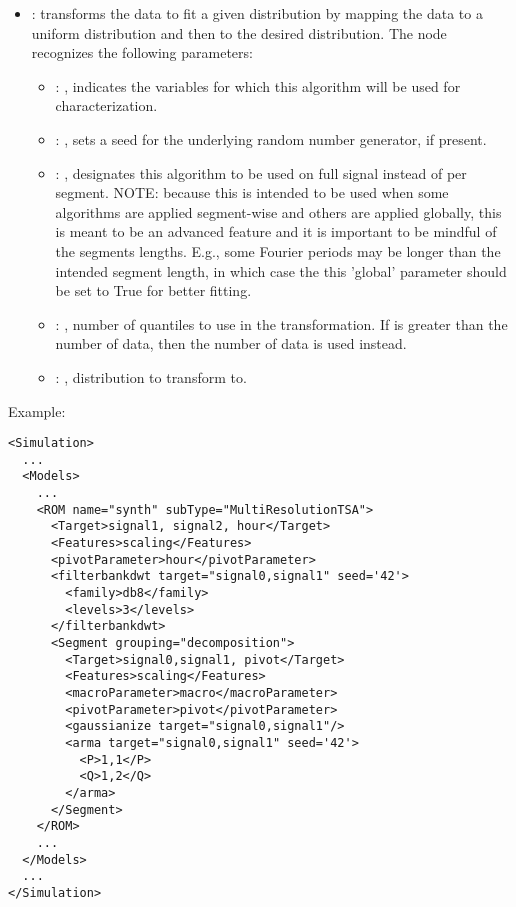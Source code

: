 \begin{itemize}
    \item {}:
      transforms the data to fit a given distribution by mapping the data to     a uniform
      distribution and then to the desired distribution.
      The  node recognizes the following parameters:
        \begin{itemize}
          \item {}: ,
            indicates the variables for which this algorithm will be used for characterization.
          \item {}: ,
            sets a seed for the underlying random number generator, if present.
          \item {}: ,
            designates this algorithm to be used on full signal instead of per
            segment. NOTE: because this is intended to be used when some algorithms are
            applied segment-wise and others are applied globally, this is meant to be an
            advanced feature and it is important to be mindful of the segments lengths.
            E.g., some Fourier periods may be longer than the intended segment length, in
            which case the this 'global' parameter should be set to True for better
            fitting. 
          \item {}: ,
            number of quantiles to use in the transformation. If 
            is greater than the number of data, then the number of data is used instead. 
          \item {}: ,
            distribution to transform to. 
      \end{itemize}
  \end{itemize}

\hspace{24pt}
Example:
\begin{lstlisting}[style=XML,morekeywords={name,subType,pivotLength,shift,target,threshold,period,width}]
<Simulation>
  ...
  <Models>
    ...
    <ROM name="synth" subType="MultiResolutionTSA">
      <Target>signal1, signal2, hour</Target>
      <Features>scaling</Features>
      <pivotParameter>hour</pivotParameter>
      <filterbankdwt target="signal0,signal1" seed='42'>
        <family>db8</family>
        <levels>3</levels>
      </filterbankdwt>
      <Segment grouping="decomposition">
        <Target>signal0,signal1, pivot</Target>
        <Features>scaling</Features>
        <macroParameter>macro</macroParameter>
        <pivotParameter>pivot</pivotParameter>
        <gaussianize target="signal0,signal1"/>
        <arma target="signal0,signal1" seed='42'>
          <P>1,1</P>
          <Q>1,2</Q>
        </arma>
      </Segment>
    </ROM>
    ...
  </Models>
  ...
</Simulation>
\end{lstlisting}


